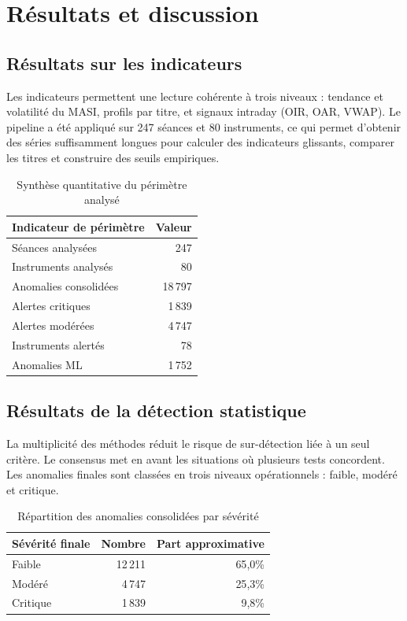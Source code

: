 \documentclass[a4paper,12pt,twoside,openright]{report}
\begin{document}
\chapter{Résultats et discussion}
\label{chap:resultats}

\section{Résultats sur les indicateurs}
Les indicateurs permettent une lecture cohérente à trois niveaux : tendance et volatilité du MASI, profils par titre, et signaux intraday (OIR, OAR, VWAP). Le pipeline a été appliqué sur 247 séances et 80 instruments, ce qui permet d'obtenir des séries suffisamment longues pour calculer des indicateurs glissants, comparer les titres et construire des seuils empiriques.

\begin{table}[H]
  \centering
  \caption{Synthèse quantitative du périmètre analysé}
  \begin{tabular}{lr}
    \toprule
    Indicateur de périmètre & Valeur \\
    \midrule
    Séances analysées & 247 \\
    Instruments analysés & 80 \\
    Anomalies consolidées & 18\,797 \\
    Alertes critiques & 1\,839 \\
    Alertes modérées & 4\,747 \\
    Instruments alertés & 78 \\
    Anomalies ML & 1\,752 \\
    \bottomrule
  \end{tabular}
\end{table}

\section{Résultats de la détection statistique}
La multiplicité des méthodes réduit le risque de sur-détection liée à un seul critère. Le consensus met en avant les situations où plusieurs tests concordent. Les anomalies finales sont classées en trois niveaux opérationnels : faible, modéré et critique.

\begin{table}[H]
  \centering
  \caption{Répartition des anomalies consolidées par sévérité}
  \begin{tabular}{lrr}
    \toprule
    Sévérité finale & Nombre & Part approximative \\
    \midrule
    Faible & 12\,211 & 65{,}0\% \\
    Modéré & 4\,747 & 25{,}3\% \\
    Critique & 1\,839 & 9{,}8\% \\
    \bottomrule
  \end{tabular}
\end{table}
\end{document}
